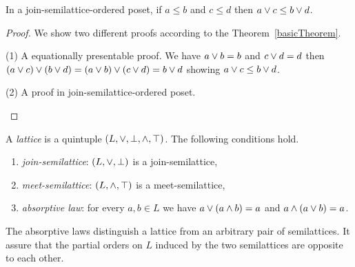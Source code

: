 \begin{proposition}\label{joinStability}
In a join-semilattice-ordered poset, 
if $a \leq b$ and $c \leq d$ then $\LTCjoinac \leq \LTCjoinbd$.
\end{proposition}
\begin{proof}
We show two different proofs according to the Theorem~\ref{basicTheorem}.

(1)  A equationally presentable proof.
We have  $\LTCjoinab = b$ and $\LTCjoincd = d$
then
$(\LTCjoinac) \LTCjoin (\LTCjoinbd) 
= (\LTCjoinab) \LTCjoin (\LTCjoincd) 
= \LTCjoinbd $ showing $\LTCjoinac \leq \LTCjoinbd$. 

(2) A proof in join-semilattice-ordered poset. 
\begin{prooftree}
			  
        	  
\end{prooftree}
\end{proof}

\begin{definition} [lattice]
A {\em lattice} is a quintuple $(L,\LTCjoin,\LTCbot,\LTCmeet,\LTCtop)$.
The following conditions hold.
\begin{enumerate}
\item {\em join-semilattice}: $(L,\LTCjoin,\LTCbot)$ is a join-semilattice,
\item {\em meet-semilattice}: $(L,\LTCmeet,\LTCtop)$ is a meet-semilattice,
\item {\em absorptive law}:  for every $a,b \in L$ we have $a \LTCjoin(a \LTCmeet b) = a$  and  $a \LTCmeet (a \LTCjoin b) = a$. 
\end{enumerate}
\end{definition}

The absorptive laws distinguish a lattice from an arbitrary pair of semilattices. It assure that the partial orders on $L$ induced by the two semilattices are opposite to each other.

